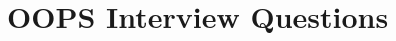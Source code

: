 \documentclass[oops.tex]{subfiles}
\begin{document}
\section{OOPS Interview Questions}
\end{document}
